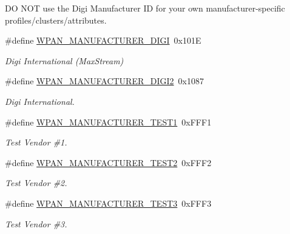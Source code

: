 DO N\+OT use the Digi Manufacturer ID for your own manufacturer-\/specific profiles/clusters/attributes. \begin{DoxyCompactItemize}
\item 
\mbox{\label{group__wpan__aps_gaa70d29d210f9c88ba4d98192da5fe49e}} 
\#define \hyperlink{group__wpan__aps_gaa70d29d210f9c88ba4d98192da5fe49e}{W\+P\+A\+N\+\_\+\+M\+A\+N\+U\+F\+A\+C\+T\+U\+R\+E\+R\+\_\+\+D\+I\+GI}~0x101E
\begin{DoxyCompactList}\small\item\em Digi International (Max\+Stream) \end{DoxyCompactList}\item 
\mbox{\label{group__wpan__aps_ga1ead60857a680665668ceefcc848476f}} 
\#define \hyperlink{group__wpan__aps_ga1ead60857a680665668ceefcc848476f}{W\+P\+A\+N\+\_\+\+M\+A\+N\+U\+F\+A\+C\+T\+U\+R\+E\+R\+\_\+\+D\+I\+G\+I2}~0x1087
\begin{DoxyCompactList}\small\item\em Digi International. \end{DoxyCompactList}\item 
\mbox{\label{group__wpan__aps_ga5c6e0e7a7b405359bceb6d8ccb95ea87}} 
\#define \hyperlink{group__wpan__aps_ga5c6e0e7a7b405359bceb6d8ccb95ea87}{W\+P\+A\+N\+\_\+\+M\+A\+N\+U\+F\+A\+C\+T\+U\+R\+E\+R\+\_\+\+T\+E\+S\+T1}~0x\+F\+F\+F1
\begin{DoxyCompactList}\small\item\em Test Vendor \#1. \end{DoxyCompactList}\item 
\mbox{\label{group__wpan__aps_ga45102d99f16b30fb8773a2c8d1a03865}} 
\#define \hyperlink{group__wpan__aps_ga45102d99f16b30fb8773a2c8d1a03865}{W\+P\+A\+N\+\_\+\+M\+A\+N\+U\+F\+A\+C\+T\+U\+R\+E\+R\+\_\+\+T\+E\+S\+T2}~0x\+F\+F\+F2
\begin{DoxyCompactList}\small\item\em Test Vendor \#2. \end{DoxyCompactList}\item 
\mbox{\label{group__wpan__aps_ga688f8334e635eccefb38df9ae08d8689}} 
\#define \hyperlink{group__wpan__aps_ga688f8334e635eccefb38df9ae08d8689}{W\+P\+A\+N\+\_\+\+M\+A\+N\+U\+F\+A\+C\+T\+U\+R\+E\+R\+\_\+\+T\+E\+S\+T3}~0x\+F\+F\+F3
\begin{DoxyCompactList}\small\item\em Test Vendor \#3. \end{DoxyCompactList}\end{DoxyCompactItemize}
